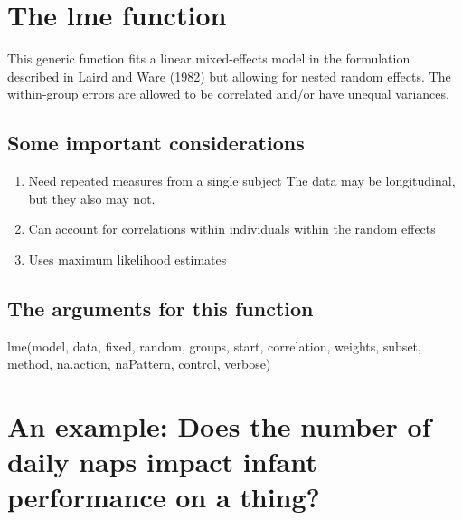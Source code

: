 \documentclass[]{book}
\begin{document}
\hypertarget{the-lme-function}{%
\section{The lme function}\label{the-lme-function}}

This generic function fits a linear mixed-effects model in the formulation described in Laird and Ware (1982) but allowing for nested random effects. The within-group errors are allowed to be correlated and/or have unequal variances.

\hypertarget{some-important-considerations}{%
\subsection{Some important considerations}\label{some-important-considerations}}

\begin{enumerate}
\def\labelenumi{\arabic{enumi}.}
\item
  Need repeated measures from a single subject The data may be longitudinal, but they also may not.
\item
  Can account for correlations within individuals within the random effects
\item
  Uses maximum likelihood estimates
\end{enumerate}

\hypertarget{the-arguments-for-this-function}{%
\subsection{The arguments for this function}\label{the-arguments-for-this-function}}

lme(model, data, fixed, random, groups, start, correlation, weights,
subset, method, na.action, naPattern, control, verbose)

\hypertarget{an-example-does-the-number-of-daily-naps-impact-infant-performance-on-a-thing}{%
\section{\texorpdfstring{\textbf{An example: Does the number of daily naps impact infant performance on a thing?}}{An example: Does the number of daily naps impact infant performance on a thing?}}\label{an-example-does-the-number-of-daily-naps-impact-infant-performance-on-a-thing}}
\end{document}
